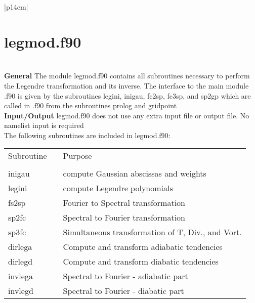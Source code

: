 \begin{center}
\begin{tabular}{|p{14cm}|}
\hline
\vspace{-5mm} \section{legmod.f90} \vspace{-5mm} \\
\hline
\vspace{1mm} {\bf General} The module {\module legmod.f90}
contains all subroutines
necessary to perform the Legendre transformation and its inverse.
The interface to the main
module {\module \modir.f90} is given by the subroutines {\sub legini}, {\sub
inigau}, {\sub fc2sp}, {\sub fc3sp}, and {\sub sp2gp}
which are called in {\module \modir.f90}
from the subroutines {\sub prolog} and {\sub gridpoint}
\vspace{3mm} \\
\hline
\vspace{1mm} {\bf Input/Output} {\module legmod.f90}
 does not use any extra input file or
output file. No namelist input is required \vspace{3mm} \\
\hline
\vspace{1mm}
The following subroutines are included in {\module legmod.f90}:

\begin{center}
\begin{tabular}{l p{2cm} l}
Subroutine & &Purpose \\
&& \\
{\sub inigau} && compute Gaussian abscissas and weights \\
{\sub legini} && compute Legendre polynomials \\
{\sub fs2sp}  && Fourier to Spectral transformation \\
{\sub sp2fc}  && Spectral to Fourier transformation \\
{\sub sp3fc}  && Simultaneous transformation of T, Div., and Vort. \\
{\sub dirlega} && Compute and transform adiabatic tendencies \\
{\sub dirlegd} && Compute and transform diabatic tendencies \\
{\sub invlega} && Spectral to Fourier - adiabatic part \\
{\sub invlegd} && Spectral to Fourier - diabatic part \\
\end{tabular}
\end{center}
\vspace{3mm} \\
\hline
\end{tabular}
\end{center}
\newpage

